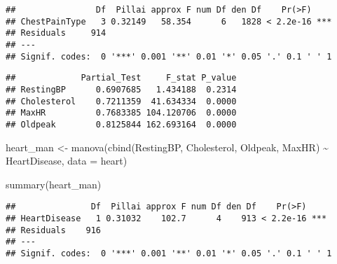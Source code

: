 \documentclass[
]{article}
\newenvironment{Shaded}{\begin{snugshade}}{\end{snugshade}}
\newcommand{\AttributeTok}[1]{\textcolor[rgb]{0.77,0.63,0.00}{#1}}
\newcommand{\CommentTok}[1]{\textcolor[rgb]{0.56,0.35,0.01}{\textit{#1}}}
\newcommand{\FunctionTok}[1]{\textcolor[rgb]{0.00,0.00,0.00}{#1}}
\newcommand{\NormalTok}[1]{#1}
\newcommand{\OtherTok}[1]{\textcolor[rgb]{0.56,0.35,0.01}{#1}}
\newcommand{\SpecialCharTok}[1]{\textcolor[rgb]{0.00,0.00,0.00}{#1}}
\begin{document}
\begin{verbatim}
##                Df  Pillai approx F num Df den Df    Pr(>F)    
## ChestPainType   3 0.32149   58.354      6   1828 < 2.2e-16 ***
## Residuals     914                                             
## ---
## Signif. codes:  0 '***' 0.001 '**' 0.01 '*' 0.05 '.' 0.1 ' ' 1
\end{verbatim}

\begin{Shaded}
\end{Shaded}

\begin{verbatim}
##             Partial_Test     F_stat P_value
## RestingBP      0.6907685   1.434188  0.2314
## Cholesterol    0.7211359  41.634334  0.0000
## MaxHR          0.7683385 104.120706  0.0000
## Oldpeak        0.8125844 162.693164  0.0000
\end{verbatim}

\begin{Shaded}
\begin{Highlighting}[]
\NormalTok{heart\_man }\OtherTok{\textless{}{-}} \FunctionTok{manova}\NormalTok{(}\FunctionTok{cbind}\NormalTok{(RestingBP, Cholesterol, Oldpeak, MaxHR) }\SpecialCharTok{\textasciitilde{}}\NormalTok{ HeartDisease,}
    \AttributeTok{data =}\NormalTok{ heart)}

\FunctionTok{summary}\NormalTok{(heart\_man)}
\end{Highlighting}
\end{Shaded}

\begin{verbatim}
##               Df  Pillai approx F num Df den Df    Pr(>F)    
## HeartDisease   1 0.31032    102.7      4    913 < 2.2e-16 ***
## Residuals    916                                             
## ---
## Signif. codes:  0 '***' 0.001 '**' 0.01 '*' 0.05 '.' 0.1 ' ' 1
\end{verbatim}
\end{document}
